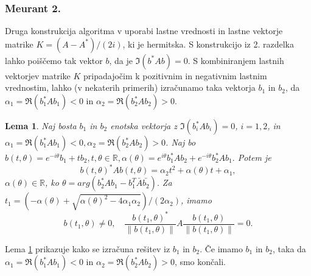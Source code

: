 \documentclass[12pt,a4paper]{amsart}
\theoremstyle{definition}
\theoremstyle{plain}
\newtheorem{lema}[definicija]{Lema}
\newcommand{\R}{\mathbb R}
\newcommand{\norm}[1]{\left\lVert#1\right\rVert}
\begin{document}
\subsubsection{Meurant 2.}
Druga konstrukcija algoritma v \cite{meurant} uporabi lastne vrednosti in lastne vektorje matrike $K=(A-A^\ast)/(2i)$, ki je hermitska. S konstrukcijo iz 2. razdelka lahko poiščemo tak vektor $b$, da je $\Im(b^\ast Ab)=0$. S kombiniranjem lastnih vektorjev matrike $K$ pripadajočim k pozitivnim in negativnim lastnim vrednostim, lahko (v nekaterih primerih) izračunamo taka vektorja $b_1$ in $b_2$, da $\alpha_1=\Re(b_1^\ast Ab_1)<0$ in $\alpha_2=\Re(b_2^\ast Ab_2)>0$. 
\begin{lema}\label{komp}
Naj bosta $b_1$ in $b_2$ enotska vektorja z $\Im(b_i^\ast Ab_i)=0$, $i=1,2$, in $\alpha_1=\Re(b_1^\ast Ab_1)<0, \alpha_2=\Re(b_2^\ast Ab_2)>0$. Naj bo $b(t,\theta)=e^{-i\theta}b_1 + tb_2, t,\theta \in \R, \alpha(\theta)=e^{i\theta}b_1^\ast Ab_2 +e^{-i\theta}b_2^\ast Ab_1.$ Potem je 
$$b(t,\theta)^\ast Ab(t,\theta)=\alpha_2 t^2 +\alpha(\theta)t+\alpha_1,$$ 
$\alpha(\theta)\in\R$, ko $\theta=arg(b_2^\ast Ab_1 -b_1^T\bar{A}\bar{b_2}).$ Za $t_1 =(-\alpha(\theta) +\sqrt{\alpha(\theta)^2 -4\alpha_1\alpha_2})/(2\alpha_2)$, imamo 
$$b(t_1, \theta) \not=0,\quad  \frac{b(t_1,\theta)^\ast}{\norm{b(t_1,\theta)}}A\frac{b(t_1,\theta)}{\norm{b(t_1,\theta)}}=0.$$
\end{lema}
Lema \ref{komp} prikazuje kako se izračuna rešitev iz $b_1$ in $b_2$. Če imamo $b_1$ in $b_2$, taka da  $\alpha_1=\Re(b_1^\ast Ab_1)<0$ in $\alpha_2=\Re(b_2^\ast Ab_2)>0$, smo končali.\\
\end{document}
